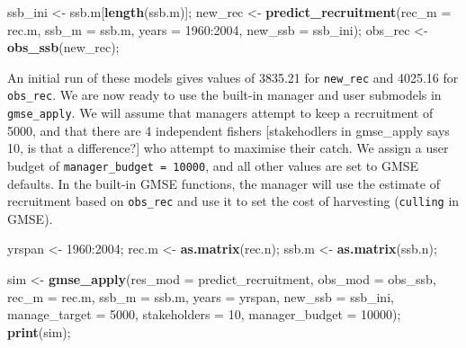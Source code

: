 \documentclass[]{article}
\newenvironment{Shaded}{\begin{snugshade}}{\end{snugshade}}
\newcommand{\KeywordTok}[1]{\textcolor[rgb]{0.13,0.29,0.53}{\textbf{{#1}}}}
\newcommand{\DataTypeTok}[1]{\textcolor[rgb]{0.13,0.29,0.53}{{#1}}}
\newcommand{\DecValTok}[1]{\textcolor[rgb]{0.00,0.00,0.81}{{#1}}}
\newcommand{\StringTok}[1]{\textcolor[rgb]{0.31,0.60,0.02}{{#1}}}
\newcommand{\NormalTok}[1]{{#1}}
\begin{document}
\begin{Shaded}
\begin{Highlighting}[]
\NormalTok{ssb_ini <-}\StringTok{ }\NormalTok{ssb.m[}\KeywordTok{length}\NormalTok{(ssb.m)];}
\NormalTok{new_rec <-}\StringTok{ }\KeywordTok{predict_recruitment}\NormalTok{(}\DataTypeTok{rec_m =} \NormalTok{rec.m, }\DataTypeTok{ssb_m =} \NormalTok{ssb.m, }\DataTypeTok{years =} \DecValTok{1960}\NormalTok{:}\DecValTok{2004}\NormalTok{,}
                               \DataTypeTok{new_ssb =} \NormalTok{ssb_ini);}
\NormalTok{obs_rec <-}\StringTok{ }\KeywordTok{obs_ssb}\NormalTok{(new_rec);}
\end{Highlighting}
\end{Shaded}

An initial run of these models gives values of 3835.21 for
\texttt{new\_rec} and 4025.16 for \texttt{obs\_rec}. We are now ready to
use the built-in manager and user submodels in \texttt{gmse\_apply}. We
will assume that managers attempt to keep a recruitment of 5000, and
that there are 4 independent fishers {[}stakehodlers in gmse\_apply says
10, is that a difference?{]} who attempt to maximise their catch. We
assign a user budget of \texttt{manager\_budget\ =\ 10000}, and all
other values are set to GMSE defaults. In the built-in GMSE functions,
the manager will use the estimate of recruitment based on
\texttt{obs\_rec} and use it to set the cost of harvesting
(\texttt{culling} in GMSE).

\begin{Shaded}
\begin{Highlighting}[]
\NormalTok{yrspan       <-}\StringTok{ }\DecValTok{1960}\NormalTok{:}\DecValTok{2004}\NormalTok{;}
\NormalTok{rec.m        <-}\StringTok{ }\KeywordTok{as.matrix}\NormalTok{(rec.n);}
\NormalTok{ssb.m        <-}\StringTok{ }\KeywordTok{as.matrix}\NormalTok{(ssb.n);}

\NormalTok{sim <-}\StringTok{ }\KeywordTok{gmse_apply}\NormalTok{(}\DataTypeTok{res_mod =} \NormalTok{predict_recruitment, }\DataTypeTok{obs_mod =} \NormalTok{obs_ssb,}
                  \DataTypeTok{rec_m =} \NormalTok{rec.m, }\DataTypeTok{ssb_m =} \NormalTok{ssb.m, }\DataTypeTok{years =} \NormalTok{yrspan, }
                  \DataTypeTok{new_ssb =} \NormalTok{ssb_ini, }\DataTypeTok{manage_target =} \DecValTok{5000}\NormalTok{, }\DataTypeTok{stakeholders =} \DecValTok{10}\NormalTok{,}
                  \DataTypeTok{manager_budget =} \DecValTok{10000}\NormalTok{);}
\KeywordTok{print}\NormalTok{(sim);}
\end{Highlighting}
\end{Shaded}
\end{document}
